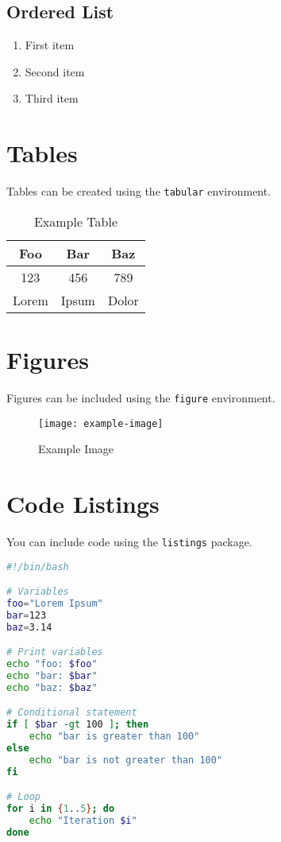 \documentclass{article}
\begin{document}
\subsection{Ordered List}
\begin{enumerate}
    \item First item
    \item Second item
    \item Third item
\end{enumerate}

\section{Tables}
Tables can be created using the \texttt{tabular} environment.

\begin{table}[h]
\centering
\begin{tabular}{|c|c|c|}
\hline
Foo & Bar & Baz \\
\hline
123 & 456 & 789 \\
\hline
Lorem & Ipsum & Dolor \\
\hline
\end{tabular}
\caption{Example Table}
\label{tab:example}
\end{table}

\section{Figures}
Figures can be included using the \texttt{figure} environment.

\begin{figure}[h]
\centering
\texttt{[image: example-image]}
\caption{Example Image}
\label{fig:example}
\end{figure}

\section{Code Listings}
You can include code using the \texttt{listings} package.

\begin{lstlisting}[language=bash, caption={Example Bash Script}]
#!/bin/bash

# Variables
foo="Lorem Ipsum"
bar=123
baz=3.14

# Print variables
echo "foo: $foo"
echo "bar: $bar"
echo "baz: $baz"

# Conditional statement
if [ $bar -gt 100 ]; then
    echo "bar is greater than 100"
else
    echo "bar is not greater than 100"
fi

# Loop
for i in {1..5}; do
    echo "Iteration $i"
done
\end{lstlisting}
\end{document}
